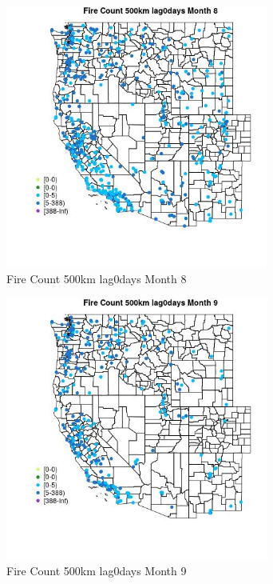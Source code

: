 \begin{figure} 
\centering  
\includegraphics[width=0.77\textwidth]{Code_Outputs/Report_ML_input_PM25_Step4_part_e_de_duplicated_aves_compiled_2019-05-18wNAs_MapObsMo8Fire_Count_500km_lag0days.jpg} 
\caption{\label{fig:Report_ML_input_PM25_Step4_part_e_de_duplicated_aves_compiled_2019-05-18wNAsMapObsMo8Fire_Count_500km_lag0days}Fire Count 500km lag0days Month 8} 
\end{figure} 
 

\clearpage 

\begin{figure} 
\centering  
\includegraphics[width=0.77\textwidth]{Code_Outputs/Report_ML_input_PM25_Step4_part_e_de_duplicated_aves_compiled_2019-05-18wNAs_MapObsMo9Fire_Count_500km_lag0days.jpg} 
\caption{\label{fig:Report_ML_input_PM25_Step4_part_e_de_duplicated_aves_compiled_2019-05-18wNAsMapObsMo9Fire_Count_500km_lag0days}Fire Count 500km lag0days Month 9} 
\end{figure} 
 


